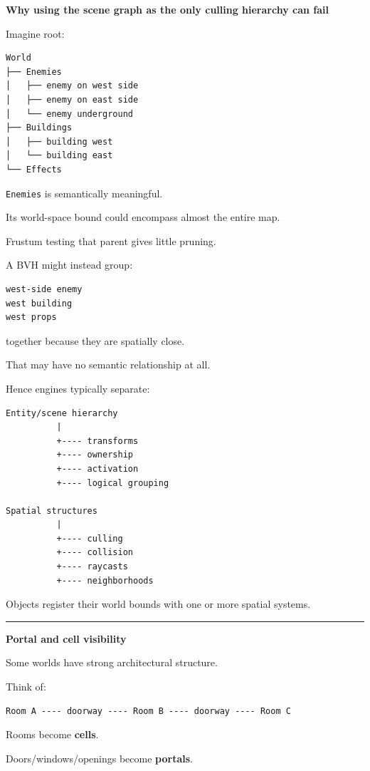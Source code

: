 \textbf{Why using the scene graph as the only culling hierarchy can fail}

Imagine root:

\begin{verbatim}
World
├── Enemies
│   ├── enemy on west side
│   ├── enemy on east side
│   └── enemy underground
├── Buildings
│   ├── building west
│   └── building east
└── Effects
\end{verbatim}

\texttt{Enemies} is semantically meaningful.

Its world-space bound could encompass almost the entire map.

Frustum testing that parent gives little pruning.

A BVH might instead group:

\begin{verbatim}
west-side enemy
west building
west props
\end{verbatim}

together because they are spatially close.

That may have no semantic relationship at all.

Hence engines typically separate:

\begin{verbatim}
Entity/scene hierarchy
          |
          +---- transforms
          +---- ownership
          +---- activation
          +---- logical grouping

Spatial structures
          |
          +---- culling
          +---- collision
          +---- raycasts
          +---- neighborhoods
\end{verbatim}

Objects register their world bounds with one or more spatial systems.

\begin{center}\rule{0.5\linewidth}{0.5pt}\end{center}

\textbf{Portal and cell visibility}

Some worlds have strong architectural structure.

Think of:

\begin{verbatim}
Room A ---- doorway ---- Room B ---- doorway ---- Room C
\end{verbatim}

Rooms become \textbf{cells}.

Doors/windows/openings become \textbf{portals}.

